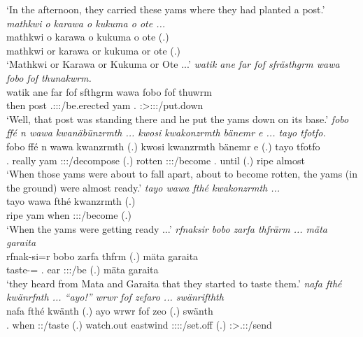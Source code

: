 \begin{exe}
	\trans `In the afternoon, they carried these yams where they had planted a post.'
	\emph{mathkwi o karawa o kukuma o ote ...}\\
	\gll mathkwi o karawa o kukuma o ote (.)\\ 
	mathkwi or karawa or kukuma or ote (.)\\
	\trans `Mathkwi or Karawa or Kukuma or Ote ...'
	\emph{watik ane far fof sfrästhgrm wawa fobo fof thunakwrm.}\\
	\gll watik ane far fof sfthgrm wawa fobo fof thuwrm\\ 
	then {\Dem} post {\Emph} \Tsg.\Masc:\Sbj:\Pst:\Dur/be.erected yam \Dist.{\All} {\Emph} \Sg:\Sbj>\Stpl:\Obj:\Pst:\Dur/put.down\\
	\trans `Well, that post was standing there and he put the yams down on its base.'
	\emph{fobo ffé n wawa kwanäbünzrmth ... kwosi kwakonzrmth bänemr e ... tayo tfotfo.}\\
	\gll fobo ffé n wawa kwanzrmth (.) kwosi kwanzrmth bänemr e (.) tayo tfotfo\\ 
	\Dist.{\All} really {\Imn} yam \Stpl:\Sbj:\Pst:\Dur/decompose (.) rotten \Stpl:\Sbj:\Pst:\Dur/become \Recog.{\Purp} until (.) ripe almost\\
	\trans `When those yams were about to fall apart, about to become rotten, the yams (in the ground) were almost ready.'
	\emph{tayo wawa fthé kwakonzrmth ...}\\
	\gll tayo wawa fthé kwanzrmth (.)\\ 
	ripe yam when \Stpl:\Sbj:\Pst:\Dur/become (.)\\
	\trans `When the yams were getting ready ...'
	\emph{rfnaksir bobo zarfa thfrärm ... mäta garaita}\\
	\gll rfnak-si=r bobo zarfa thfrm (.) mäta garaita\\ 
	taste-\Nmlz={\Purp} \Med.{\All} ear \Stpl:\Sbj:\Pst:\Dur/be (.) mäta garaita\\
	\trans `they heard from Mata and Garaita that they started to taste them.'
\newpage 
{} 
	\emph{nafa fthé kwänrfnth ... ``ayo!'' wrwr fof zefaro ... swänrifthth}\\
	\gll nafa fthé kwänth (.) ayo wrwr fof zeo (.) swänth\\ 
	\Tnsg.{\Erg} when \Stpl:\Sbj:\Iter/taste (.) watch.out eastwind {\Emph} \Sg:\Sbj:\Pst:\Pfv:\Andat/set.off (.) \Stpl:\Sbj>\Tsg.\Masc:\Obj:\Iter/send\\

\end{exe}
